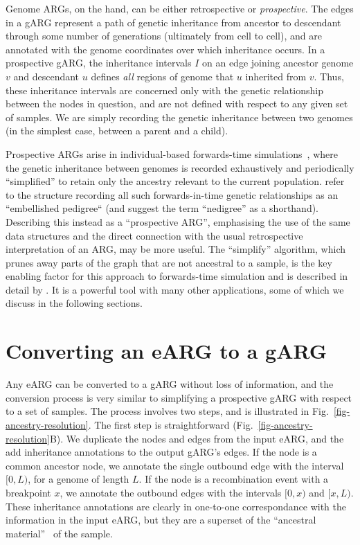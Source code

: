 \documentclass{article}
\begin{document}
Genome ARGs, on the hand,
can be either retrospective or \emph{prospective}.
The edges in a gARG represent a path of genetic inheritance from
ancestor to descendant through some
number of generations (ultimately from cell to cell),
and are annotated
with the genome coordinates over which inheritance occurs.
In a prospective gARG, the inheritance intervals $I$
on an edge joining ancestor genome $v$ and descendant $u$
defines \emph{all} regions of genome that $u$ inherited from $v$.
Thus, these  inheritance intervals are
concerned only with the genetic relationship
between the nodes in question, and are not defined with respect
to any given set of samples. We are simply recording the
genetic inheritance between two genomes
(in the simplest case, between a parent and a child).

Prospective ARGs arise in individual-based forwards-time
simulations~\citep{kelleher2018efficient,haller2018tree},
where the genetic inheritance between genomes is recorded
exhaustively and periodically
``simplified'' to retain only
the ancestry relevant to the current population.
\citet{kelleher2018efficient} refer to the structure
recording all such forwards-in-time genetic relationships
as an ``embellished pedigree`` (and suggest the term ``nedigree'' as a shorthand).
Describing this instead as a ``prospective ARG'', emphasising
the use of the same data structures and the direct connection with
the usual retrospective interpretation of an ARG, may be
more useful.
The ``simplify'' algorithm, which prunes away parts of the graph that
are not ancestral to a sample, is the key enabling factor for
this approach to forwards-time simulation and is
described in detail by
\citet{kelleher2018efficient}. It is a
powerful tool with many other applications,
some of which we discuss in the following sections.

\section*{Converting an eARG to a gARG}
Any eARG can be converted to a gARG without loss of information,
and the conversion process is very similar to
simplifying a prospective gARG with respect to a set of samples.
The process involves two steps, and is illustrated in
Fig.~\ref{fig-ancestry-resolution}.
The first step is straightforward
(Fig.~\ref{fig-ancestry-resolution}B).
We duplicate the nodes and
edges from the input eARG, and the add inheritance annotations
to the output gARG's edges. If the node is a common ancestor node,
we annotate the single outbound edge with the interval $[0,L)$,
for a genome of length $L$.
If the node is a recombination event with a breakpoint $x$,
we annotate the outbound edges with the intervals $[0, x)$
and $[x, L)$.
These inheritance annotations are clearly in one-to-one
correspondance with the information in the input eARG,
but they are a superset of the
``ancestral material''~\citep{wiuf1999ancestry,wiuf1999recombination}
of the sample.
\end{document}

